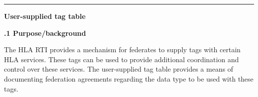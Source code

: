 \documentclass[10pt]{article}
\begin{document}
\vspace{8pt}
{\color{Rule}\rule{\textwidth}{0.6pt}}\par\vspace{8pt}
{\sffamily\bfseries\fontsize{13.5}{16} User-supplied tag table}\par
\vspace{3pt}
{\sffamily\bfseries\fontsize{10.2}{12.4}.1 Purpose/background}\par\vspace{3pt}
{\fontsize{8.8}{12}\selectfont The HLA RTI provides a mechanism for federates to supply tags with certain HLA services. These tags can be used to provide additional coordination and control over these services. The user-supplied tag table provides a means of documenting federation agreements regarding the data type to be used with these tags.}

\newpage
\end{document}
